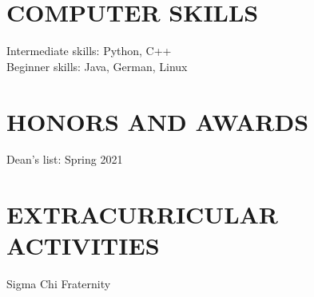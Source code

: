 \documentclass{res}
\begin{document}
\begin{resume}
\section{COMPUTER SKILLS}          
    Intermediate skills: Python, C++\\
    Beginner skills: Java, German, Linux          
 
 
\section{HONORS AND AWARDS}          
    Dean's list: Spring 2021         
 
\section{EXTRACURRICULAR ACTIVITIES}          
    Sigma Chi Fraternity         
 
\end{resume}
\end{document}
